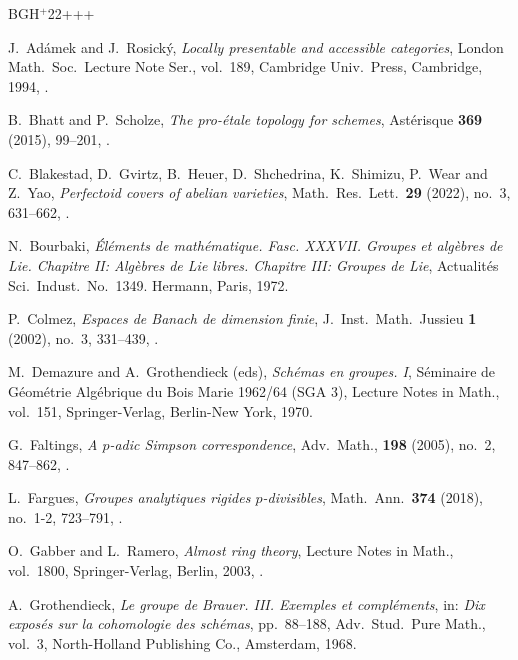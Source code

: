 \documentclass[11pt]{amsart}
\numberwithin{equation}{section}
\theoremstyle{definition}
\theoremstyle{remark}
\begin{document}
\newcommand{\etalchar}[1]{$^{#1}$}
\begin{thebibliography}{BGH{\etalchar{+}}22+++}
	
J.~Ad\'{a}mek and  J.~Rosick\'{y}, 
{\em Locally presentable and accessible categories}, London Math.\ Soc.\ Lecture Note Ser., vol.~189, Cambridge Univ.\ Press, Cambridge, 1994, .

B.~Bhatt and  P.~Scholze, 
{\em {T}he pro-\'{e}tale topology for schemes}, Ast\'{e}risque \textbf{369} (2015), 99--201, .
        
\bibitem[BGH{\etalchar{+}}22]{perfectoid-covers-Arizona}
C.~Blakestad, D.~Gvirtz, B.~Heuer, D.~Shchedrina, K.~Shimizu, P.~Wear and  Z.~Yao, 
{\em {P}erfectoid covers of abelian varieties}, Math.\ Res.\ Lett.\ \textbf{29} (2022), no.~3, 
631--662,  .
	
N.~Bourbaki, 
{\em \'{E}l\'{e}ments de math\'{e}matique. {F}asc. {XXXVII}.  {G}roupes et alg\`ebres de {L}ie. {C}hapitre {II}: {A}lg\`ebres de {L}ie libres. {C}hapitre {III}: {G}roupes de {L}ie}, Actualit\'{e}s Sci.\ Indust.\, No.~1349. Hermann, Paris, 1972.
	

P.~Colmez, 
{\em {E}spaces de {B}anach de dimension finie}, J.~Inst.\ Math.\ Jussieu \textbf{1} (2002), no.~3, 331--439, .

M.~Demazure and A.~Grothendieck (eds), \emph{Sch\'emas en groupes. I}, S\'eminaire de G\'eom\'etrie Alg\'ebrique du Bois Marie 1962/64 (SGA 3), Lecture Notes in Math., vol.~151, Springer-Verlag, Berlin-New York, 1970.

G.~Faltings, 
{\em {A} {$p$}-adic {S}impson correspondence}, Adv.\ Math., \textbf{198} (2005), no.~2, 847--862, .
	
L.~Fargues, 
{\em {G}roupes analytiques rigides {$p$}-divisibles}, Math.\ Ann.\ \textbf{374} (2018), no.~1-2, 723--791, .
	
O.~Gabber and L.~Ramero, 
{\em {A}lmost ring theory},  Lecture Notes in Math., vol.~1800, Springer-Verlag, Berlin, 2003, .
	
A.~Grothendieck, 
{\em Le groupe de {B}rauer. {III}. {E}xemples et compl\'{e}ments}, in: {\em Dix expos\'{e}s sur la cohomologie des sch\'{e}mas}, pp.~88--188, Adv.\ Stud.\ Pure Math., vol.~3, North-Holland Publishing Co., Amsterdam, 1968.


\end{thebibliography}
\end{document}
